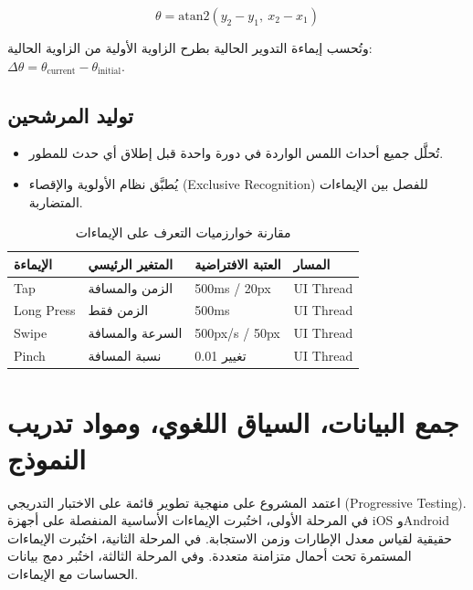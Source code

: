 \begin{Arabic}
\begin{equation}
\theta = \text{atan2}(y_2 - y_1,\ x_2 - x_1)
\end{equation}

وتُحسب إيماءة التدوير الحالية بطرح الزاوية الأولية من الزاوية الحالية: $\Delta\theta = \theta_{\text{current}} - \theta_{\text{initial}}$.

\subsection{توليد المرشحين}

\begin{itemize}
    \item تُحلَّل جميع أحداث اللمس الواردة في دورة واحدة قبل إطلاق أي حدث للمطور.
    \item يُطبَّق نظام الأولوية والإقصاء (\textenglish{Exclusive Recognition}) للفصل بين الإيماءات المتضاربة.
\end{itemize}

\begin{table}[htbp]
\centering
\caption{مقارنة خوارزميات التعرف على الإيماءات}
\label{tab:gesture-algorithms}
\begin{tabularx}{\textwidth}{XXXX}
\toprule
\textbf{الإيماءة} & \textbf{المتغير الرئيسي} & \textbf{العتبة الافتراضية} & \textbf{المسار} \\
\midrule
\textenglish{Tap} & الزمن والمسافة & 500ms / 20px & \textenglish{UI Thread} \\
\rowcolor{gray!10}
\textenglish{Long Press} & الزمن فقط & 500ms & \textenglish{UI Thread} \\
\textenglish{Swipe} & السرعة والمسافة & 500px/s / 50px & \textenglish{UI Thread} \\
\rowcolor{gray!10}
\textenglish{Pinch} & نسبة المسافة & 0.01 تغيير & \textenglish{UI Thread} \\
\bottomrule
\end{tabularx}
\end{table}

\section{جمع البيانات، السياق اللغوي، ومواد تدريب النموذج}

اعتمد المشروع على منهجية تطوير قائمة على الاختبار التدريجي (\textenglish{Progressive Testing}). في المرحلة الأولى، اختُبرت الإيماءات الأساسية المنفصلة على أجهزة \textenglish{iOS} و\textenglish{Android} حقيقية لقياس معدل الإطارات وزمن الاستجابة. في المرحلة الثانية، اختُبرت الإيماءات المستمرة تحت أحمال متزامنة متعددة. وفي المرحلة الثالثة، اختُبر دمج بيانات الحساسات مع الإيماءات.


\end{Arabic}
